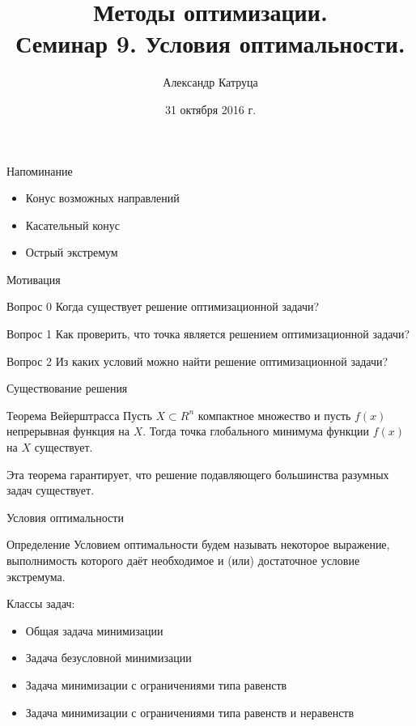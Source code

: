 \documentclass[12pt,russian]{beamer}
\title[Семинар 9]{Методы оптимизации. \\
 Семинар 9. Условия оптимальности.}
\author{Александр Катруца}
\institute{Московский физико-технический институт,\\
Факультет Управления и Прикладной Математики}
\date{31 октября 2016 г.}
\begin{document}
\begin{frame}
\maketitle
\end{frame}

\begin{frame}{Напоминание}
\begin{itemize}
\item Конус возможных направлений
\item Касательный конус
\item Острый экстремум
\end{itemize}
\end{frame}

\begin{frame}{Мотивация}

\begin{block}{Вопрос 0}
Когда существует решение оптимизационной задачи?
\end{block}

\begin{block}{Вопрос 1}
Как проверить, что точка является решением оптимизационной задачи? 
\end{block}

\begin{block}{Вопрос 2}
Из каких условий можно найти решение оптимизационной задачи?
\end{block}

\end{frame}

\begin{frame}{Существование решения}
\begin{block}{Теорема Вейерштрасса}
Пусть $X \subset R^n$ компактное множество и пусть $f(x)$ непрерывная функция на $X$. 
Тогда точка глобального минимума функции $f (x)$ на $X$ существует.
\end{block}

Эта теорема гарантирует, что решение подавляющего большинства разумных задач существует.
 
\end{frame}

\begin{frame}{Условия оптимальности}
\begin{block}{Определение}
Условием оптимальности будем называть некоторое выражение, выполнимость которого даёт необходимое и (или) достаточное условие экстремума. 
\end{block}
Классы задач:
\begin{itemize}
\item Общая задача минимизации
\item Задача безусловной минимизации
\item Задача минимизации с ограничениями типа равенств
\item Задача минимизации с ограничениями типа равенств и неравенств
\end{itemize}
\end{frame}
\end{document}
